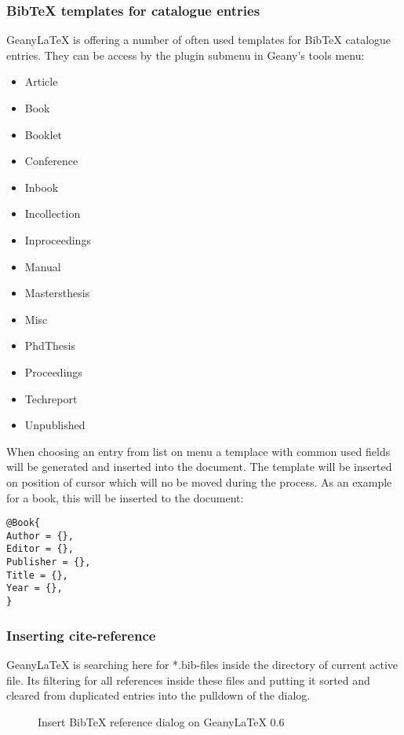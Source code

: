 \documentclass[%
paper=a4,%
fontsize=11pt,%
twoside=false,%
DIV18,%
headsepline,%
plainheadsepline,%
footsepline,%
plainfootsepline,%
bibliography=totoc,%
listof=totoc,%
BCOR10mm,%
parskip=half,%
openany,%
]{scrartcl}
\begin{document}
\subsubsection{BibTeX templates for catalogue entries}
Geany\LaTeX{} is offering a number of often used templates for BibTeX
catalogue entries. They can be access by the plugin submenu in Geany's
tools menu:
\begin{itemize}
	\item Article
	\item Book
	\item Booklet
	\item Conference
	\item Inbook
	\item Incollection
	\item Inproceedings
	\item Manual
	\item Mastersthesis
	\item Misc
	\item PhdThesis
	\item Proceedings
	\item Techreport
	\item Unpublished
\end{itemize}
When choosing an entry from list on menu a templace with common used
fields will be generated and inserted into the document.
The template will be inserted on position of cursor which will
no be moved during the process. As an example for a book, this will be
inserted to the document:

\begin{lstlisting}[caption={Example of BibTeX entry for a book}]
@Book{
Author = {},
Editor = {},
Publisher = {},
Title = {},
Year = {},
}
\end{lstlisting}


\subsubsection{Inserting cite-reference}

Geany\LaTeX{} is searching here for *.bib-files inside the directory
of current active file. Its filtering for all references inside
these files and putting it sorted and cleared from duplicated
entries into the pulldown of the dialog.

\begin{figure}[h!]
	\caption{Insert BibTeX reference dialog on Geany\LaTeX{} 0.6}
\end{figure}
\end{document}
